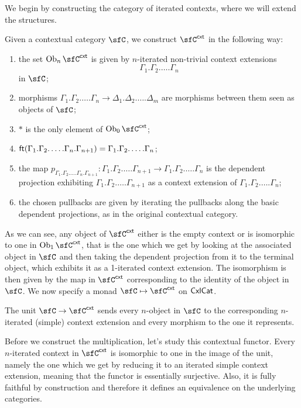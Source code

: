 We begin by constructing the category of iterated contexts, where we
will extend the structures.

\begin{construction}\cite[21]{Lum10}
  Given a contextual category $\sfC$, we construct $\sfC^{\cxt}$ in the following way:
  \begin{enumerate}
    \item the set $\Ob_n\sfC^{\cxt}$ is given by $n$-iterated non-trivial context
      extensions
      \[\Gamma_1.\Gamma_2.\ldots.\Gamma_n\]
      in $\sfC$;
    \item morphisms
      $\Gamma_1.\Gamma_2.\ldots.\Gamma_n\rightarrow\Delta_1.\Delta_2.\ldots.\Delta_m$
      are morphisms between them seen as objects of $\sfC$;
    \item $*$ is the only element of $\Ob_0\sfC^{\cxt}$;
    \item
      $\operatorname{\mathsf{ft}}(\Gamma_1.\Gamma_2.\ldots.\Gamma_n.\Gamma_{n+1})=\Gamma_1.\Gamma_2.\ldots.\Gamma_n$;
    \item the map $p_{\Gamma_1.\Gamma_2.\ldots.\Gamma_n.\Gamma_{n+1}}\colon
      \Gamma_1.\Gamma_2.\ldots.\Gamma_{n+1}\rightarrow
      \Gamma_1.\Gamma_2.\ldots.\Gamma_n$ is the dependent projection exhibiting
      $\Gamma_1.\Gamma_2.\ldots.\Gamma_{n+1}$ as a context extension of
      $\Gamma_1.\Gamma_2.\ldots.\Gamma_n$;
    \item the chosen pullbacks are given by iterating the pullbacks along the
      basic dependent projections, as in the original contextual category.
  \end{enumerate}

  As we can see, any object of $\sfC^{\cxt}$ either is the empty context or is
  isomorphic to one in
  $\Ob_1\sfC^{\cxt}$, that is the one which we get by looking at the associated object
  in $\sfC$ and then taking the dependent projection from it to the terminal
  object, which exhibits it as a 1-iterated context extension. The isomorphism
  is then given by the map in $\sfC^{\cxt}$ corresponding to the identity of the
  object in $\sfC$. We now specify a monad $\sfC\mapsto\sfC^{\cxt}$ on $\operatorname{\mathsf{CxlCat}}$.

  The unit $\sfC\rightarrow\sfC^{\cxt}$ sends every $n$-object in $\sfC$ to
  the corresponding $n$-iterated (simple) context extension and every morphism
  to the one it represents.

  Before we construct the multiplication, let's study this contextual functor.
  Every $n$-iterated
  context in $\sfC^{\cxt}$ is isomorphic to one in the image of the unit, namely
  the one which we get by reducing it to an iterated simple context extension,
  meaning that the functor is essentially surjective. Also, it is fully faithful
  by construction and therefore it defines an equivalence on the underlying
  categories.


\end{construction}
